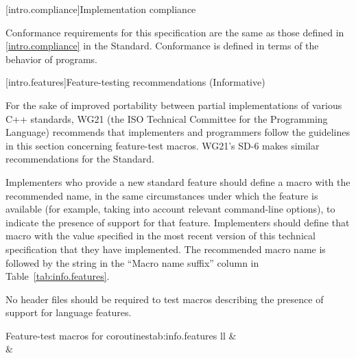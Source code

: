 [intro.compliance]{Implementation compliance}

\pnum
Conformance requirements for this specification are the same as those 
defined in \ref{intro.compliance} in the \Cpp Standard.
\enternote 
Conformance is defined in terms of the behavior of programs.
\exitnote

[intro.features]{Feature-testing recommendations (Informative)}

\pnum
For the sake of improved portability between partial implementations of various
C++ standards, WG21 (the ISO Technical Committee for the \Cpp Programming
Language) recommends that implementers and programmers follow the guidelines in
this section concerning feature-test macros. 
\enternote 
WG21's SD-6 makes similar recommendations for the \Cpp Standard.
\exitnote

\pnum
Implementers who provide a new standard feature should define a macro with the
recommended name, in the same circumstances under which the feature is available
(for example, taking into account relevant command-line options), to indicate
the presence of support for that feature. Implementers should define that macro
with the value specified in the most recent version of this technical
specification that they have implemented. The recommended macro name is
 followed by the string in the ``Macro name suffix''
column in Table~\ref{tab:info.features}.

\pnum
No header files should be required to test macros describing the presence
of support for language features.

\begin{floattable}{Feature-test macros for coroutines}{tab:info.features}
{ll}
\topline
{} &  \\
\capsep
{}  &       \\
\end{floattable}

%

